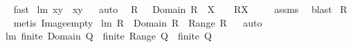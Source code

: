 \begin{isabellebody}
\isadelimproof
\ %
\endisadelimproof
%
\isatagproof
{}\isamarkupfalse%
\ fast%
\endisatagproof
{\isafoldproof}%
%
\isadelimproof
%
\endisadelimproof
\isanewline
\isanewline
{}\isamarkupfalse%
\ lm{}{}{\isacharcolon}\ {\isachardoublequoteopen}{\isacharbraceleft}x{\isacharbraceright}{\isacharminus}{\isacharbraceleft}y{\isacharbraceright}{\isacharequal}{\isacharbraceleft}{\isacharbraceright}\ {\isacharequal}\ {\isacharparenleft}x{\isacharequal}y{\isacharparenright}{\isachardoublequoteclose}%
\isadelimproof
\ %
\endisadelimproof
%
\isatagproof
{}\isamarkupfalse%
\ auto%
\endisatagproof
{\isafoldproof}%
%
\isadelimproof
%
\endisadelimproof
\isanewline
\isanewline
{}\isamarkupfalse%
\ \ {\isachardoublequoteopen}R\ {\isasymnoteq}\ {\isacharbraceleft}{\isacharbraceright}{\isachardoublequoteclose}\ {\isachardoublequoteopen}Domain\ R\ {\isasyminter}\ X\ {\isasymnoteq}\ {\isacharbraceleft}{\isacharbraceright}{\isachardoublequoteclose}\ \ {\isachardoublequoteopen}R{\isacharbackquote}{\isacharbackquote}X\ {\isasymnoteq}\ {\isacharbraceleft}{\isacharbraceright}{\isachardoublequoteclose}%
\isadelimproof
\ %
\endisadelimproof
%
\isatagproof
{}\isamarkupfalse%
\ assms\ \isamarkupfalse%
\ blast%
\endisatagproof
{\isafoldproof}%
%
\isadelimproof
%
\endisadelimproof
\isanewline
\isanewline
{}\isamarkupfalse%
\ {\isachardoublequoteopen}R{\isacharbackquote}{\isacharbackquote}{\isacharbraceleft}{\isacharbraceright}{\isacharequal}{\isacharbraceleft}{\isacharbraceright}{\isachardoublequoteclose}%
\isadelimproof
\ %
\endisadelimproof
%
\isatagproof
{}\isamarkupfalse%
\ {\isacharparenleft}metis\ Image{\isacharunderscore}empty{\isacharparenright}%
\endisatagproof
{\isafoldproof}%
%
\isadelimproof
%
\endisadelimproof
\isanewline
\isanewline
{}\isamarkupfalse%
\ lm{}{}{\isacharcolon}\ {\isachardoublequoteopen}R\ {\isasymsubseteq}\ {\isacharparenleft}Domain\ R{\isacharparenright}\ {\isasymtimes}\ {\isacharparenleft}Range\ R{\isacharparenright}{\isachardoublequoteclose}%
\isadelimproof
\ %
\endisadelimproof
%
\isatagproof
{}\isamarkupfalse%
\ auto%
\endisatagproof
{\isafoldproof}%
%
\isadelimproof
%
\endisadelimproof
\isanewline
\isanewline
{}\isamarkupfalse%
\ lm{}{}{\isacharcolon}\ {\isachardoublequoteopen}{\isacharparenleft}finite\ {\isacharparenleft}Domain\ Q{\isacharparenright}\ {\isacharampersand}\ finite\ {\isacharparenleft}Range\ Q{\isacharparenright}{\isacharparenright}\ {\isacharequal}\ finite\ Q{\isachardoublequoteclose}%

\end{isabellebody}

